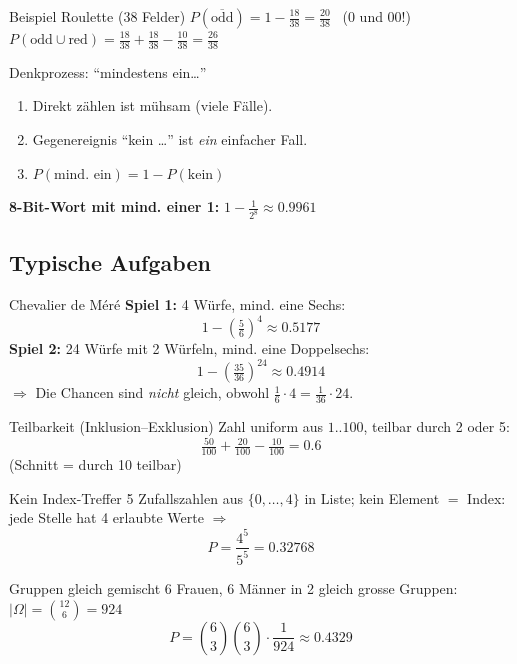 \documentclass[a4paper, fontsize=7pt]{scrartcl}
\begin{document}
\begin{subbox}{Beispiel Roulette (38 Felder)}
$P(\overline{\text{odd}}) = 1 - \frac{18}{38} = \frac{20}{38}$ \ (0 und 00!)\\
$P(\text{odd} \cup \text{red}) = \frac{18}{38} + \frac{18}{38} - \frac{10}{38}
= \frac{26}{38}$
\end{subbox}

\begin{subbox}{Denkprozess: ``mindestens ein\ldots''}
\begin{enumerate}
    \item Direkt zählen ist mühsam (viele Fälle).
    \item Gegenereignis ``kein \ldots'' ist \emph{ein} einfacher Fall.
    \item $P(\text{mind. ein}) = 1 - P(\text{kein})$
\end{enumerate}
\textbf{8-Bit-Wort mit mind. einer 1:} $1 - \frac{1}{2^8} \approx 0.9961$
\end{subbox}

\subsection{Typische Aufgaben}

\begin{subbox}{Chevalier de Méré}
\textbf{Spiel 1:} 4 Würfe, mind. eine Sechs:
$$1 - \left(\tfrac{5}{6}\right)^4 \approx 0.5177$$
\textbf{Spiel 2:} 24 Würfe mit 2 Würfeln, mind. eine Doppelsechs:
$$1 - \left(\tfrac{35}{36}\right)^{24} \approx 0.4914$$
$\Rightarrow$ Die Chancen sind \emph{nicht} gleich, obwohl $\frac{1}{6} \cdot 4 =
\frac{1}{36} \cdot 24$.
\end{subbox}

\begin{subbox}{Teilbarkeit (Inklusion--Exklusion)}
Zahl uniform aus $1..100$, teilbar durch 2 oder 5:
$$\tfrac{50}{100} + \tfrac{20}{100} - \tfrac{10}{100} = 0.6$$
(Schnitt = durch 10 teilbar)
\end{subbox}

\begin{subbox}{Kein Index-Treffer}
5 Zufallszahlen aus $\{0,\ldots,4\}$ in Liste; kein Element $=$ Index:
jede Stelle hat 4 erlaubte Werte $\Rightarrow$
$$P = \frac{4^5}{5^5} = 0.32768$$
\end{subbox}

\begin{subbox}{Gruppen gleich gemischt}
6 Frauen, 6 Männer in 2 gleich grosse Gruppen:
$|\Omega| = \binom{12}{6} = 924$
$$P = \binom{6}{3}\binom{6}{3} \cdot \frac{1}{924} \approx 0.4329$$
\end{subbox}
\end{document}
